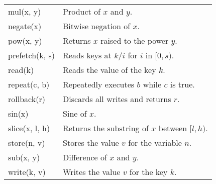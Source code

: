 \documentclass[../main.tex]{subfiles}
\begin{document}
\begin{table}[ht]
\begin{tabular}{l | l}
    mul(x, y)                & Product of $x$ and $y$.                                            \\
    negate(x)                & Bitwise negation of $x$.                                           \\
    pow(x, y)                & Returns $x$ raised to the power $y$.                               \\
    prefetch(k, s)           & Reads keys at $k/i$ for $i$ in $[0, s)$.                           \\
    read(k)                  & Reads the value of the key $k$.                                    \\
    repeat(c, b)             & Repeatedly executes $b$ while $c$ is true.                         \\
    rollback(r)              & Discards all writes and returns $r$.                               \\
    sin(x)                   & Sine of $x$.                                                       \\
    slice(x, l, h)           & Returns the substring of $x$ between $[l, h)$.                     \\
    store(n, v)              & Stores the value $v$ for the variable $n$.                         \\
    sub(x, y)                & Difference of $x$ and $y$.                                         \\
    write(k, v)              & Writes the value $v$ for the key $k$.                              \\
  \end{tabular}
  \label{table:expressions}
\end{table}
\end{document}
